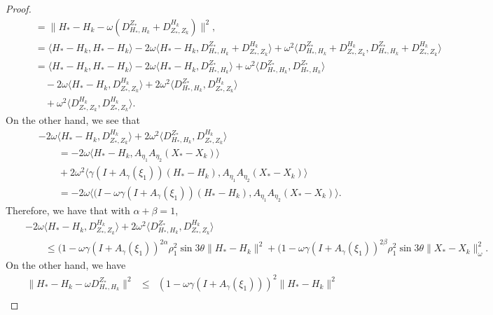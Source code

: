 \begin{proof}
\begin{eqnarray*}
&& \quad = \|H_* - H_k - \omega (D_{H_*,H_k}^{Z_*} + D_{Z_*,Z_k}^{H_k})\|^2,  \\
&& \quad = \langle H_* - H_k, H_* - H_k \rangle - 2 \omega \langle H_* - H_k, D_{H_*,H_k}^{Z_*} + D_{Z_*,Z_k}^{H_k} \rangle + \omega^2 \langle  D_{H_*,H_k}^{Z_*} + D_{Z_*,Z_k}^{H_k},  D_{H_*,H_k}^{Z_*} + D_{Z_*,Z_k}^{H_k}\rangle \\ 
&& \quad = \langle H_* - H_k, H_* - H_k \rangle - 2 \omega \langle H_* - H_k, D_{H_*,H_k}^{Z_*} \rangle + \omega^2 \langle D_{H_*,H_k}^{Z_*}, D_{H_*,H_k}^{Z_*}\rangle \\ 
&& \qquad - 2 \omega \langle H_* - H_k, D_{Z_*,Z_k}^{H_k} \rangle + 2 \omega^2 \langle  
D_{H_*,H_k}^{Z_*}, D_{Z_*,Z_k}^{H_k} \rangle \\
&& \qquad + \omega^2 \langle D_{Z_*,Z_k}^{H_k},  D_{Z_*,Z_k}^{H_k} \rangle. 
\end{eqnarray*}
On the other hand, we see that 
\begin{eqnarray*}
&& -2\omega \langle H_* - H_k, D_{Z_*,Z_k}^{H_k} \rangle + 2\omega^2 \langle D_{H_*,H_k}^{Z_*}, D_{Z_*,Z_k}^{H_k}  \rangle \\
&& \qquad = -2\omega \langle H_* - H_k, A_{\eta_1} A_{\eta_2} (X_*  - X_k) \rangle \\ 
&& \qquad + 2 \omega^2 \langle \gamma (I + A_\gamma (\xi_1)) (H_* - H_k), A_{\eta_1} A_{\eta_2} (X_*  - X_k)  \rangle \\
&& \qquad = - 2\omega \langle (I - \omega \gamma (I + A_\gamma(\xi_1))(H_* - H_k), A_{\eta_1} A_{\eta_2} (X_*  - X_k) \rangle. 
\end{eqnarray*}
Therefore, we have that with $\alpha + \beta = 1$, 
\begin{eqnarray*}
&& -2\omega \langle H_* - H_k, D_{Z_*,Z_k}^{H_k} \rangle + 2\omega^2 \langle D_{H_*,H_k}^{Z_*}, D_{Z_*,Z_k}^{H_k}  \rangle \\
&& \qquad \leq (1 - \omega \gamma (I + A_\gamma(\xi_1))^{2\alpha} \rho_1^2 \sin 3 \theta \|H_* - H_k\|^2 + (1 - \omega \gamma (I +  A_\gamma(\xi_1))^{2\beta} \rho_1^2 \sin 3 \theta \|X_* - X_k\|_\omega^2. 
\end{eqnarray*}
On the other hand, we have 
\begin{eqnarray*}
\|H_* - H_k - \omega D_{H_*,H_k}^{Z_*} \|^2 &\leq& 
(1 - \omega \gamma (I + A_\gamma(\xi_1)))^2 \|H_* - H_k\|^2 \\ 

\end{eqnarray*}
\end{proof}
